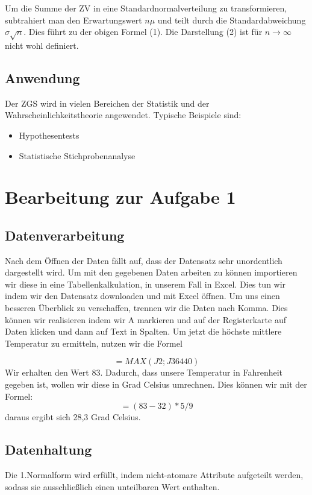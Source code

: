 \documentclass{article}
\begin{document}
Um die Summe der ZV in eine Standardnormalverteilung zu transformieren, subtrahiert man den Erwartungswert $n\mu$ und teilt durch die Standardabweichung $\sigma\sqrt{n}$. Dies führt zu der obigen Formel (1). Die Darstellung (2) ist für $n\rightarrow\infty$ nicht wohl definiert. 




\subsection{Anwendung}
Der ZGS wird in vielen Bereichen der Statistik und der Wahrscheinlichkeitstheorie angewendet. Typische Beispiele sind: 
\begin{itemize}
    \item Hypothesentests 
    \item Statistische Stichprobenanalyse
\end{itemize}


\newpage
\section{Bearbeitung zur Aufgabe 1}
\subsection{Datenverarbeitung}
Nach dem Öffnen der Daten fällt auf, dass der Datensatz sehr unordentlich dargestellt wird. Um mit den gegebenen Daten arbeiten zu können importieren wir diese in eine Tabellenkalkulation, in unserem Fall in Excel. Dies tun wir indem wir den Datensatz downloaden und mit Excel öffnen.
Um uns einen besseren Überblick zu verschaffen, trennen wir die Daten nach Komma. Dies können wir realisieren indem wir A markieren und auf der Registerkarte auf Daten klicken und dann auf Text in Spalten. Um jetzt die höchste mittlere Temperatur zu ermitteln, nutzen wir die Formel

$$=MAX(J2;J36440)$$
Wir erhalten den Wert 83. Dadurch, dass unsere Temperatur in Fahrenheit gegeben ist, wollen wir diese in Grad Celsius umrechnen. Dies können wir mit der Formel: $$=(83-32)*5/9$$ daraus ergibt sich 28,3 Grad Celsius.

\subsection{Datenhaltung}
Die 1.Normalform wird erfüllt, indem nicht-atomare Attribute aufgeteilt werden, sodass sie ausschließlich einen unteilbaren Wert enthalten.
\end{document}
